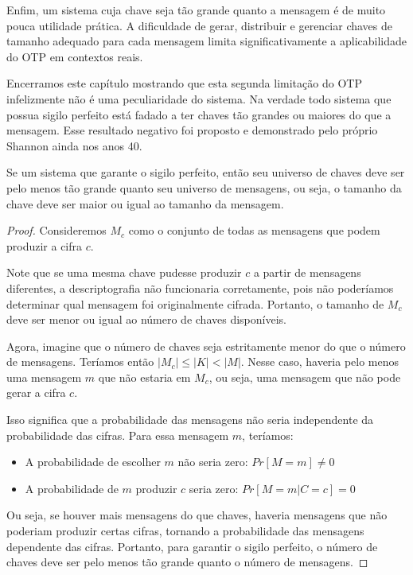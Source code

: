 Enfim, um sistema cuja chave seja tão grande quanto a mensagem é de muito pouca utilidade prática.
A dificuldade de gerar, distribuir e gerenciar chaves de tamanho adequado para cada mensagem limita significativamente a aplicabilidade do OTP em contextos reais.

Encerramos este capítulo mostrando que esta segunda limitação do OTP infelizmente não é uma peculiaridade do sistema.
Na verdade todo sistema que possua sigilo perfeito está fadado a ter chaves tão grandes ou maiores do que a mensagem.
Esse resultado negativo foi proposto e demonstrado pelo próprio Shannon ainda nos anos 40.


\begin{theorem}[Shannon]
Se um sistema que garante o sigilo perfeito, então seu universo de chaves deve ser pelo menos tão grande quanto seu universo de mensagens, ou seja, o tamanho da chave deve ser maior ou igual ao tamanho da mensagem.
\end{theorem}
\begin{proof}
Consideremos $M_c$ como o conjunto de todas as mensagens que podem produzir a cifra $c$.

Note que se uma mesma chave pudesse produzir $c$ a partir de mensagens diferentes, a descriptografia não funcionaria corretamente, pois não poderíamos determinar qual mensagem foi originalmente cifrada.
Portanto, o tamanho de $M_c$ deve ser menor ou igual ao número de chaves disponíveis.

Agora, imagine que o número de chaves seja estritamente menor do que o número de mensagens.
Teríamos então $|M_c| \leq |K| < |M|$.
Nesse caso, haveria pelo menos uma mensagem $m$ que não estaria em $M_c$, ou seja, uma mensagem que não pode gerar a cifra $c$.

Isso significa que a probabilidade das mensagens não seria independente da probabilidade das cifras. Para essa mensagem $m$, teríamos:
\begin{itemize}
\item A probabilidade de escolher $m$ não seria zero: $Pr[M = m] \neq 0$
\item A probabilidade de $m$ produzir $c$ seria zero: $Pr[M = m | C = c] = 0$
\end{itemize}

Ou seja, se houver mais mensagens do que chaves, haveria mensagens que não poderiam produzir certas cifras, tornando a probabilidade das mensagens dependente das cifras.
Portanto, para garantir o sigilo perfeito, o número de chaves deve ser pelo menos tão grande quanto o número de mensagens.
\end{proof}

